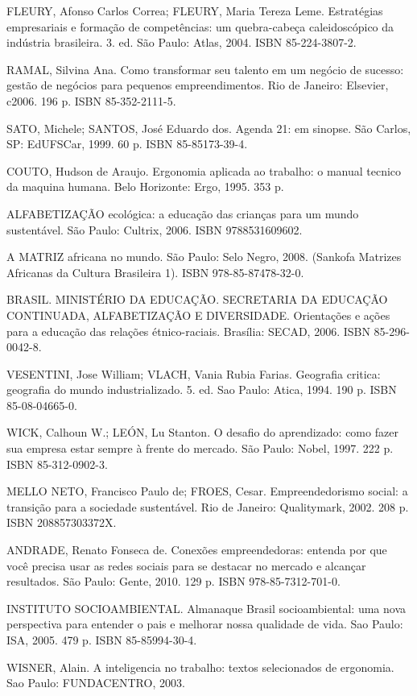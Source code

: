 {{        FLEURY, Afonso Carlos Correa; FLEURY, Maria Tereza Leme. Estratégias empresariais e formação de competências: um quebra-cabeça caleidoscópico da indústria brasileira. 3. ed. São Paulo: Atlas, 2004. ISBN 85-224-3807-2.

        RAMAL, Silvina Ana. Como transformar seu talento em um negócio de sucesso: gestão de negócios para pequenos empreendimentos. Rio de Janeiro: Elsevier, c2006. 196 p. ISBN 85-352-2111-5.

        SATO, Michele; SANTOS, José Eduardo dos. Agenda 21: em sinopse. São Carlos, SP: EdUFSCar, 1999. 60 p. ISBN 85-85173-39-4.

        COUTO, Hudson de Araujo. Ergonomia aplicada ao trabalho: o manual tecnico da maquina humana. Belo Horizonte: Ergo, 1995. 353 p.

        ALFABETIZAÇÃO ecológica: a educação das crianças para um mundo sustentável. São Paulo: Cultrix, 2006. ISBN 9788531609602.

        A MATRIZ africana no mundo. São Paulo: Selo Negro, 2008.  (Sankofa Matrizes Africanas da Cultura Brasileira 1). ISBN 978-85-87478-32-0.

        BRASIL. MINISTÉRIO DA EDUCAÇÃO. SECRETARIA DA EDUCAÇÃO CONTINUADA, ALFABETIZAÇÃO E DIVERSIDADE. Orientações e ações para a educação das relações étnico-raciais. Brasília: SECAD, 2006. ISBN 85-296-0042-8.
    }
    {
        VESENTINI, Jose William; VLACH, Vania Rubia Farias. Geografia critica: geografia do mundo industrializado. 5. ed. Sao Paulo: Atica, 1994. 190 p. ISBN 85-08-04665-0.

    WICK, Calhoun W.; LEÓN, Lu Stanton. O desafio do aprendizado: como fazer sua empresa estar sempre à frente do mercado. São Paulo: Nobel, 1997. 222 p. ISBN 85-312-0902-3.

    MELLO NETO, Francisco Paulo de; FROES, Cesar. Empreendedorismo social: a transição para a sociedade sustentável. Rio de Janeiro: Qualitymark, 2002. 208 p. ISBN 208857303372X.

    ANDRADE, Renato Fonseca de. Conexões empreendedoras: entenda por que você precisa usar as redes sociais para se destacar no mercado e alcançar resultados. São Paulo: Gente, 2010. 129 p. ISBN 978-85-7312-701-0.

    INSTITUTO SOCIOAMBIENTAL. Almanaque Brasil socioambiental: uma nova perspectiva para entender o pais e melhorar nossa qualidade de vida. Sao Paulo: ISA, 2005. 479 p. ISBN 85-85994-30-4.

    WISNER, Alain. A inteligencia no trabalho: textos selecionados de ergonomia. Sao Paulo: FUNDACENTRO, 2003.

}}
